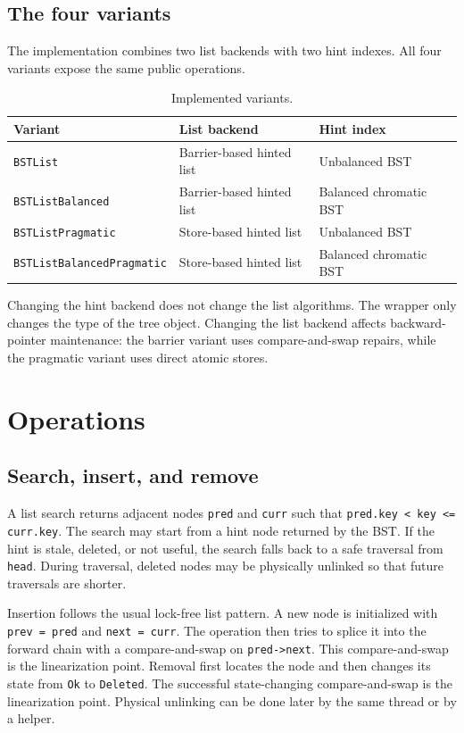 \documentclass[a4paper,11pt]{article}
\newcommand{\code}[1]{\texttt{#1}}
\begin{document}
\subsection{The four variants}

The implementation combines two list backends with two hint indexes. All four variants expose the same public operations.

\begin{table}[H]
\centering
\caption{Implemented variants.}
\label{tab:variants}
\begin{tabular}{lll}
\toprule
Variant & List backend & Hint index \\
\midrule
\code{BSTList} & Barrier-based hinted list & Unbalanced BST \\
\code{BSTListBalanced} & Barrier-based hinted list & Balanced chromatic BST \\
\code{BSTListPragmatic} & Store-based hinted list & Unbalanced BST \\
\code{BSTListBalancedPragmatic} & Store-based hinted list & Balanced chromatic BST \\
\bottomrule
\end{tabular}
\end{table}

Changing the hint backend does not change the list algorithms. The wrapper only changes the type of the tree object. Changing the list backend affects backward-pointer maintenance: the barrier variant uses compare-and-swap repairs, while the pragmatic variant uses direct atomic stores.

\section{Operations}

\subsection{Search, insert, and remove}

A list search returns adjacent nodes \code{pred} and \code{curr} such that \code{pred.key < key <= curr.key}. The search may start from a hint node returned by the BST. If the hint is stale, deleted, or not useful, the search falls back to a safe traversal from \code{head}. During traversal, deleted nodes may be physically unlinked so that future traversals are shorter.

Insertion follows the usual lock-free list pattern. A new node is initialized with \code{prev = pred} and \code{next = curr}. The operation then tries to splice it into the forward chain with a compare-and-swap on \code{pred->next}. This compare-and-swap is the linearization point. Removal first locates the node and then changes its state from \code{Ok} to \code{Deleted}. The successful state-changing compare-and-swap is the linearization point. Physical unlinking can be done later by the same thread or by a helper.
\end{document}
